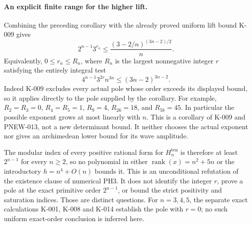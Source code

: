 \paragraph{An explicit finite range for the higher lift.}
Combining the preceding corollary with the already proved uniform
lift bound K-009 gives
\[
 2^{n-1}3^{r_n}\le
       \frac{(3-2/n)^{(3n-2)/2}}{n}.
 \tag{PNEW-M11}
\]
Equivalently, $0\le r_n\le R_n$, where $R_n$ is the largest
nonnegative integer $r$ satisfying the entirely integral test
\[
       4^{n-1}3^{2r}n^{3n}\le(3n-2)^{3n-2}.
 \tag{PNEW-M12}
\]
Indeed K-009 excludes every actual pole whose order exceeds
its displayed bound, so it applies directly to the pole supplied
by the corollary. For example, $R_2=R_3=0$,
$R_4=R_5=1$, $R_9=4$, $R_{26}=18$, and $R_{58}=45$.
In particular the possible exponent grows at most linearly with
$n$. This is a corollary of K-009 and PNEW-013, not a new
determinant bound. It neither chooses the actual exponent nor
gives an archimedean lower bound for its wave amplitude.

The modular index of every positive rational form for
$H_n^{\mathrm{ten}}$ is therefore at least $2^{n-1}$ for
every $n\ge2$, so no polynomial in either
$\operatorname{rank}(x)=n^2+5n$ or the introductory
$h=n^4+O(n)$ bounds it.
This is an unconditional refutation of the existence clause
of numerical PH3. It does not identify the
integer $r$, prove a pole at the exact primitive order
$2^{n-1}$, or bound the strict positivity and saturation
indices. Those are distinct questions. For $n=3,4,5$, the
separate exact calculations K-001, K-008 and K-014 establish
the pole with $r=0$; no such uniform exact-order conclusion
is inferred here.
